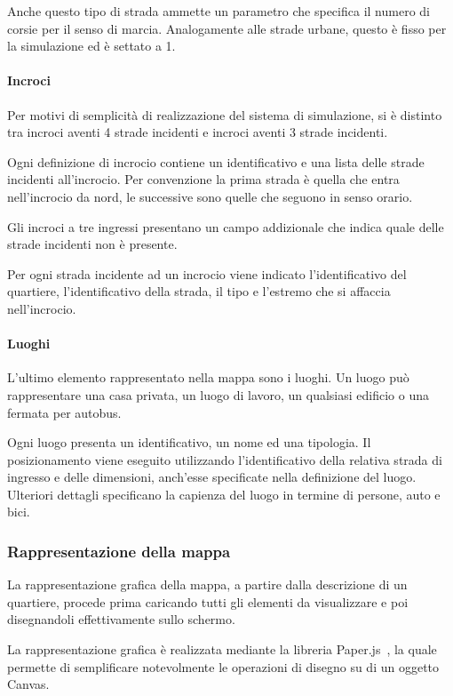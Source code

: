 Anche questo tipo di strada ammette un parametro che specifica il numero di
corsie per il senso di marcia. Analogamente alle strade urbane, questo è fisso
per la simulazione ed è settato a 1.

\paragraph*{Incroci}
Per motivi di semplicità di realizzazione del sistema di simulazione, si è
distinto tra incroci aventi 4 strade incidenti e incroci aventi 3 strade
incidenti. 

Ogni definizione di incrocio contiene un identificativo e una lista delle strade
incidenti all'incrocio. Per convenzione la prima strada è quella che entra
nell'incrocio da nord, le successive sono quelle che seguono in senso orario.

Gli incroci a tre ingressi presentano un campo addizionale che indica quale
delle strade incidenti non è presente.

Per ogni strada incidente ad un incrocio viene indicato l'identificativo del
quartiere, l'identificativo della strada, il tipo e l'estremo che si affaccia
nell'incrocio.

\paragraph*{Luoghi}
L'ultimo elemento rappresentato nella mappa sono i luoghi. Un luogo può
rappresentare una casa privata, un luogo di lavoro, un qualsiasi edificio o una
fermata per autobus. 

Ogni luogo presenta un identificativo, un nome ed una tipologia. Il
posizionamento viene eseguito utilizzando l'identificativo della relativa strada
di ingresso e delle dimensioni, anch'esse specificate nella definizione del
luogo. Ulteriori dettagli specificano la capienza del luogo in termine di
persone, auto e bici.

\subsubsection{Rappresentazione della mappa}
La rappresentazione grafica della mappa, a partire dalla descrizione di un
quartiere, procede prima caricando tutti gli elementi da visualizzare e poi
disegnandoli effettivamente sullo schermo.

La rappresentazione grafica è realizzata mediante la libreria
Paper.js~\cite{paperjs}, la quale permette di semplificare notevolmente le
operazioni di disegno su di un oggetto Canvas.

